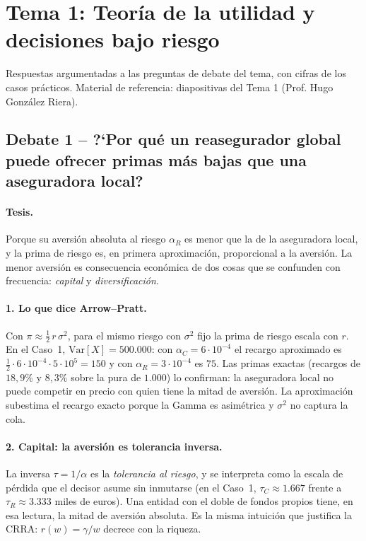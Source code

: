 \documentclass[a4paper,12pt]{article}
\newcommand{\Var}{\mathrm{Var}}
\begin{document}
\restoregeometry
\newpage
{}
\setcounter{page}{1}

\section{Tema 1: Teoría de la utilidad y decisiones bajo riesgo}
\label{sec:tema1debate}
\noindent
Respuestas argumentadas a las preguntas de debate del tema, con cifras de los casos prácticos. Material de referencia: diapositivas del Tema 1 (Prof. Hugo González Riera).

\subsection{Debate 1 -- ?`Por qu\'e un reasegurador global puede ofrecer primas m\'as bajas que una aseguradora local?}

\paragraph{Tesis.} Porque su aversi\'on absoluta al riesgo $\alpha_R$ es menor que la de la aseguradora local, y la prima de riesgo es, en primera aproximaci\'on, proporcional a la aversi\'on. La menor aversi\'on es consecuencia econ\'omica de dos cosas que se confunden con frecuencia: \emph{capital} y \emph{diversificaci\'on}.

\paragraph{1. Lo que dice Arrow--Pratt.} Con $\pi\approx\tfrac12\,r\,\sigma^2$, para el mismo riesgo con $\sigma^2$ fijo la prima de riesgo escala con $r$. En el Caso~1, $\Var[X]=500.000$: con $\alpha_C=6\cdot10^{-4}$ el recargo aproximado es $\tfrac12\cdot6\cdot10^{-4}\cdot5\cdot10^5=150$ y con $\alpha_R=3\cdot10^{-4}$ es $75$. Las primas exactas (recargos de $18{,}9\%$ y $8{,}3\%$ sobre la pura de $1.000$) lo confirman: la aseguradora local no puede competir en precio con quien tiene la mitad de aversi\'on. La aproximaci\'on subestima el recargo exacto porque la Gamma es asim\'etrica y $\sigma^2$ no captura la cola.

\paragraph{2. Capital: la aversi\'on es tolerancia inversa.} La inversa $\tau=1/\alpha$ es la \emph{tolerancia al riesgo}, y se interpreta como la escala de p\'erdida que el decisor asume sin inmutarse (en el Caso~1, $\tau_C\approx1.667$ frente a $\tau_R\approx3.333$ miles de euros). Una entidad con el doble de fondos propios tiene, en esa lectura, la mitad de aversi\'on absoluta. Es la misma intuici\'on que justifica la CRRA: $r(w)=\gamma/w$ decrece con la riqueza.
\end{document}
